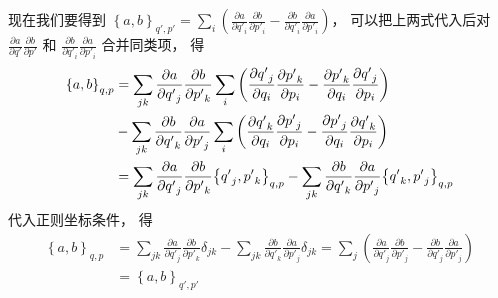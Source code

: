 现在我们要得到 ${\left\{ {a,b} \right\}_{q',p'}} = \sum\limits_i {\left( {\frac{{\partial a}}{{\partial {{q'}_i}}}\frac{{\partial b}}{{\partial {{p'}_i}}} - \frac{{\partial b}}{{\partial {{q'}_i}}}\frac{{\partial a}}{{\partial {{p'}_i}}}} \right)} $，  可以把上两式代入后对 $\frac{{\partial a}}{{\partial q'}}\frac{{\partial b}}{{\partial p'}}$ 和 $\frac{{\partial b}}{{\partial {{q'}_i}}}\frac{{\partial a}}{{\partial {{p'}_i}}}$ 合并同类项， 得
  \begin{equation}
\begin{aligned}
  {\left\{ {a,b} \right\}_{q,p}}& = \sum\limits_{jk} {\frac{{\partial a}}{{\partial {{q'}_j}}}\frac{{\partial b}}{{\partial {{p'}_k}}}} \sum\limits_i {\left( {\frac{{\partial {{q'}_j}}}{{\partial {q_i}}}\frac{{\partial {{p'}_k}}}{{\partial {p_i}}} - \frac{{\partial {{p'}_k}}}{{\partial {q_i}}}\frac{{\partial {{q'}_j}}}{{\partial {p_i}}}} \right)}  \\
  &   - \sum\limits_{jk} {\frac{{\partial b}}{{\partial {{q'}_k}}}\frac{{\partial a}}{{\partial {{p'}_j}}}} \sum\limits_i {\left( {\frac{{\partial {{q'}_k}}}{{\partial {q_i}}}\frac{{\partial {{p'}_j}}}{{\partial {p_i}}} - \frac{{\partial {{p'}_j}}}{{\partial {q_i}}}\frac{{\partial {{q'}_k}}}{{\partial {p_i}}}} \right)}  \hfill \\
   &= \sum\limits_{jk} {\frac{{\partial a}}{{\partial {{q'}_j}}}\frac{{\partial b}}{{\partial {{p'}_k}}}{{\left\{ {{{q'}_j},{{p'}_k}} \right\}}_{q,p}}}  - \sum\limits_{jk} {\frac{{\partial b}}{{\partial {{q'}_k}}}\frac{{\partial a}}{{\partial {{p'}_j}}}} {\left\{ {{{q'}_k},{{p'}_j}} \right\}_{q,p}}
\end{aligned}
\end{equation}
代入正则坐标条件， 得
  \begin{equation}
  \begin{aligned}
{\left\{ {a,b} \right\}_{q,p}}& = \sum\limits_{jk} {\frac{{\partial a}}{{\partial {{q'}_j}}}\frac{{\partial b}}{{\partial {{p'}_k}}}{\delta _{jk}}}  - \sum\limits_{jk} {\frac{{\partial b}}{{\partial {{q'}_k}}}\frac{{\partial a}}{{\partial {{p'}_j}}}} {\delta _{jk}} = \sum\limits_j {\left( {\frac{{\partial a}}{{\partial {{q'}_j}}}\frac{{\partial b}}{{\partial {{p'}_j}}} - \frac{{\partial b}}{{\partial {{q'}_j}}}\frac{{\partial a}}{{\partial {{p'}_j}}}} \right)}  \\
&= {\left\{ {a,b} \right\}_{q',p'}}
\end{aligned}
\end{equation}
